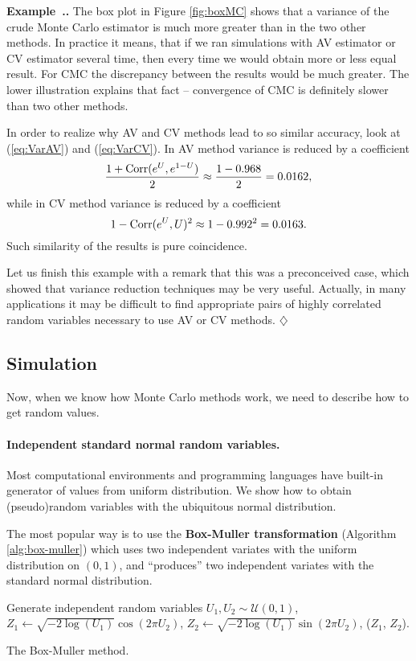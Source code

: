 \documentclass[a4paper,11pt, twoside]{book}
\theoremstyle{definition}
\theoremstyle{remark}
\newcounter{example}[chapter]
\newenvironment{example}
   {\refstepcounter{example} \par\medskip\noindent \textbf{Example~\arabic{chapter}.\arabic{example}.}  }
   {\hfill $\diamondsuit$\par\noindent\ignorespacesafterend}
\def\Corr{{\hbox{Corr}}}
\begin{document}
\begin{example}
The box plot in Figure \ref{fig:boxMC} shows that a variance of the crude Monte Carlo estimator is much more greater than in the two other methods. In practice it means, that if we ran simulations with AV estimator or CV estimator several time, then every time we would obtain more or less equal result. For CMC the discrepancy between the results would be much greater.
The lower illustration explains that fact -- convergence of CMC is definitely slower than two other methods.

In order to realize why AV and CV methods lead to so similar accuracy, look at (\ref{eq:VarAV}) and (\ref{eq:VarCV}). In AV method variance is reduced by a coefficient
\[ \frac{1 + \Corr(e^U, e^{1-U})}{2} \approx \frac{1 - 0.968}{2} = 0.0162, \]
while in CV method variance is reduced by a coefficient
\[ 1 - \Corr(e^U, U)^2 \approx 1 - 0.992^2 = 0.0163. \]
Such similarity of the results is pure coincidence.

Let us finish this example with a remark that this was a preconceived case, which showed that variance reduction techniques may be very useful. Actually, in many applications it may be difficult to find appropriate pairs of highly correlated random variables necessary to use AV or CV methods.
\end{example}


\subsection{Simulation}
Now, when we know how Monte Carlo methods work, we need to describe how to get random values.
\paragraph{Independent standard normal random variables.} Most computational environments and programming languages have built-in generator of values from uniform distribution. We show how to obtain (pseudo)random variables with the ubiquitous normal distribution.

The most popular way is to use the \textbf{Box-Muller transformation} (Algorithm \ref{alg:box-muller}) which uses two independent variates with the uniform distribution on $(0,1)$, and ``produces'' two independent variates with the standard normal distribution.
\begin{algorithm}
 \begin{algorithmic}[1]
    \State Generate independent random variables $U_1, U_2 \sim \mathcal{U}(0,1)$,
    \State $Z_1 \gets \sqrt{-2\log(U_1)} \cos(2\pi U_2)$,
    \State $Z_2 \gets \sqrt{-2\log(U_1)} \sin(2\pi U_2)$,
    \State \Return ($Z_1$, $Z_2$).
  \EndFunction
 \end{algorithmic}
 \caption{The Box-Muller method.}
 \label{alg:box-muller}
\end{algorithm}
\end{document}
